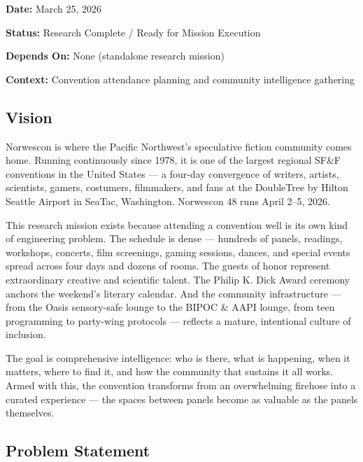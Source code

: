 \documentclass[11pt,letterpaper]{article}
\newcommand{\metafield}[2]{\textbf{\sffamily #1} #2\par}
\begin{document}
\metafield{Date:}{March 25, 2026}
\metafield{Status:}{Research Complete / Ready for Mission Execution}
\metafield{Depends On:}{None (standalone research mission)}
\metafield{Context:}{Convention attendance planning and community intelligence gathering}

\subsection{Vision}

Norwescon is where the Pacific Northwest's speculative fiction community comes home. Running continuously since 1978, it is one of the largest regional SF\&F conventions in the United States --- a four-day convergence of writers, artists, scientists, gamers, costumers, filmmakers, and fans at the DoubleTree by Hilton Seattle Airport in SeaTac, Washington. Norwescon 48 runs April 2--5, 2026.

This research mission exists because attending a convention well is its own kind of engineering problem. The schedule is dense --- hundreds of panels, readings, workshops, concerts, film screenings, gaming sessions, dances, and special events spread across four days and dozens of rooms. The guests of honor represent extraordinary creative and scientific talent. The Philip K. Dick Award ceremony anchors the weekend's literary calendar. And the community infrastructure --- from the Oasis sensory-safe lounge to the BIPOC \& AAPI lounge, from teen programming to party-wing protocols --- reflects a mature, intentional culture of inclusion.

The goal is comprehensive intelligence: who is there, what is happening, when it matters, where to find it, and how the community that sustains it all works. Armed with this, the convention transforms from an overwhelming firehose into a curated experience --- the spaces between panels become as valuable as the panels themselves.

\subsection{Problem Statement}
\end{document}
